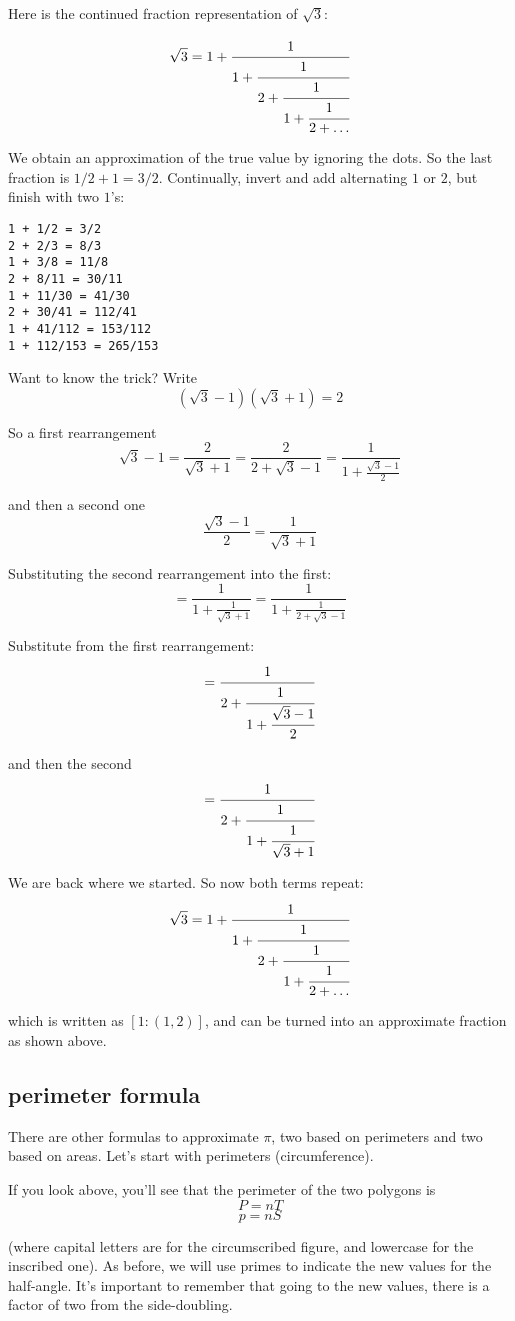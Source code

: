 \documentclass[11pt, oneside]{article}
\begin{document}
Here is the continued fraction representation of $\sqrt{3}$:

\[ \sqrt{3} = 1 + \cfrac{1}{1+\cfrac{1}{2+\cfrac{1}{1 + \cfrac{1}{2 + \dots }}}}  \]

We obtain an approximation of the true value by ignoring the dots.  So the last fraction is $1/2 + 1 = 3/2$.  Continually, invert and add alternating $1$ or $2$, but finish with two $1$'s:

\begin{verbatim}
1 + 1/2 = 3/2
2 + 2/3 = 8/3
1 + 3/8 = 11/8
2 + 8/11 = 30/11
1 + 11/30 = 41/30
2 + 30/41 = 112/41
1 + 41/112 = 153/112
1 + 112/153 = 265/153
\end{verbatim}

Want to know the trick?  Write
\[ (\sqrt{3} - 1)(\sqrt{3} + 1) = 2 \]

So a first rearrangement
\[ \sqrt{3} - 1 = \frac{2}{\sqrt{3} + 1} = \frac{2}{2 + \sqrt{3} - 1} = \frac{1}{1 + \frac{\sqrt{3} - 1}{2}} \]

and then a second one
\[ \frac{\sqrt{3} - 1}{2} = \frac{1}{\sqrt{3} + 1} \]

Substituting the second rearrangement into the first:
\[ = \frac{1}{1 + \frac{1}{\sqrt{3} + 1} } = \frac{1}{1 + \frac{1}{2 + \sqrt{3} - 1}}   \]

Substitute from the first rearrangement:
\[ = \cfrac{1}{2+\cfrac{1}{1+\cfrac{\sqrt{3}-1}{2}}}  \]

and then the second
\[ = \cfrac{1}{2+\cfrac{1}{1+\cfrac{1}{\sqrt{3} + 1}}}  \]

We are back where we started.  So now both terms repeat:
\[ \sqrt{3} = 1 + \cfrac{1}{1+\cfrac{1}{2+\cfrac{1}{1 + \cfrac{1}{2 + \dots }}}}  \]

which is written as $[1:(1,2)]$, and can be turned into an approximate fraction as shown above.

\subsection*{perimeter formula}

There are other formulas to approximate $\pi$, two based on perimeters and two based on areas.  Let's start with perimeters (circumference).  

If you look above, you'll see that the perimeter of the two polygons is
\[ P = nT \]
\[ p = nS \]

(where capital letters are for the circumscribed figure, and lowercase for the inscribed one).  As before, we will use primes to indicate the new values for the half-angle.  It's important to remember that going to the new values, there is a factor of two from the side-doubling.
\end{document}
